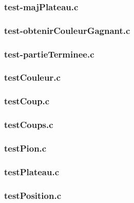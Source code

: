 \subsubsection{test-majPlateau.c}

\vline

\subsubsection{test-obtenirCouleurGagnant.c}

\vline

\subsubsection{test-partieTerminee.c}

\vline

\subsubsection{testCouleur.c}

\vline

\subsubsection{testCoup.c}

\vline

\subsubsection{testCoups.c}

\vline

\subsubsection{testPion.c}

\vline

\subsubsection{testPlateau.c}

\vline

\subsubsection{testPosition.c}

\vline





